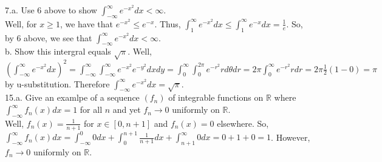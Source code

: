 \documentclass[12pt]{article}
\begin{document}
7.a. Use 6 above to show $\int_{-\infty}^{\infty}e^{-x^2}dx<\infty$.\\
Well, for $x\geq1$, we have that $e^{-x^2}\leq e^{-x}$. Thus, $\int_{1}^{\infty}e^{-x^2}dx\leq\int_{1}^{\infty}e^{-x}dx=\frac1e$. So, by 6 above, we see that $\int_{-\infty}^{\infty}e^{-x^2}dx<\infty$.\\
b. Show this intergral equals $\sqrt{\pi}$.
Well,$(\int_{-\infty}^{\infty}e^{-x^2}dx)^2=\int_{-\infty}^{\infty}\int_{-\infty}^{\infty}e^{-x^2}e^{-y^2}dxdy=\int_{0}^{\infty}\int_{0}^{2\pi}e^{-r^2}rd\theta dr=2\pi\int_{0}^{\infty}e^{-r^2}rdr=2\pi\frac12(1-0)=\pi$ by u-substitution. Therefore $\int_{-\infty}^{\infty}e^{-x^2}dx=\sqrt{\pi}$.\\[20pt]

15.a. Give an examlpe of a sequence $(f_n)$ of integrable functions on $\mathbb{R}$ where $\int_{-\infty}^{\infty}f_n(x)dx=1$ for all $n$ and yet $f_n\rightarrow0$ uniformly on $\mathbb{R}$.\\
Well, $f_n(x)=\frac{1}{n+1}$ for $x\in[0,n+1]$ and $f_n(x)=0$ elsewhere. So, $\int_{-\infty}^{\infty}f_n(x)dx=\int_{-\infty}^{0}0dx+\int_{0}^{n+1}\frac{1}{n+1}dx+\int_{n+1}^{\infty}0dx=0+1+0=1$. However, $f_n\rightarrow0$ uniformly on $\mathbb{R}$.
\end{document}
